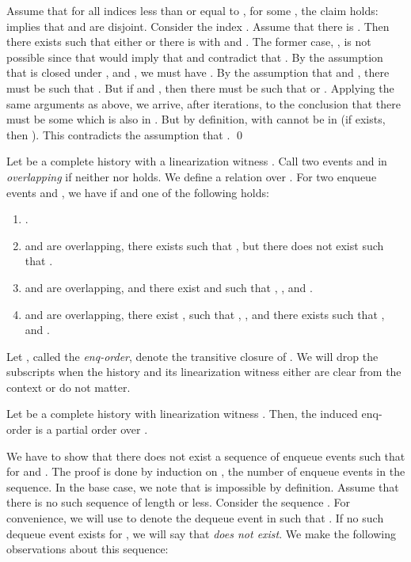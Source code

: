 \documentclass{LMCS}
\newcommand\mylabel[1]{\label{#1}}
\begin{document}
Assume that for all indices less than or equal to , for some , the claim holds:  implies that  and  are disjoint.
Consider the index .
Assume that there is . 
Then there exists  such that either  or there is  with  and .
The former case, , is not possible since that would imply that  and contradict that .
By the assumption that  is closed under ,  and , we must have .
By the assumption that  and , there must be  such that .
But if  and , then there must be  such that  or .
Applying the same arguments as above, we arrive, after  iterations, to the conclusion that there must be some  which is also in .
But by definition,  with  cannot be in  (if  exists, then ).
This contradicts the assumption that .
\qed


\begin{defi}
Let  be a complete history with a linearization witness .
Call two events  and  in  {\em overlapping} if neither  nor  holds.
We define a relation  over . 
For two enqueue events  and , we have  if  and one of the following holds:
\begin{enumerate}
\item .
\item  and  are overlapping, there exists  such that , but there does not exist  such that .
\item {\sloppy  and  are overlapping, and there exist  and  such that , , and .}
\item  and  are overlapping, there exist ,  such that , , and there exists  such that ,  and .
\end{enumerate}
Let , called the {\em enq-order}, denote the transitive closure of .
We will drop the subscripts when the history  and its linearization witness either are clear from the context or do not matter.
\end{defi}

\begin{lem}\mylabel{ref:enq-order-total}
Let  be a complete history with linearization witness .
Then, the induced enq-order  is a partial order over .
\end{lem}
\proof
We have to show that there does not exist a sequence  of enqueue events such that  for  and .
The proof is done by induction on , the number of enqueue events in the sequence.
In the base case, we note that  is impossible by definition.
Assume that there is no such sequence of length  or less.
Consider the sequence .
For convenience, we will use  to denote the dequeue event in  such that . 
If no such dequeue event exists for , we will say that {\em  does not exist}.
We make the following observations about this sequence:
\end{document}
